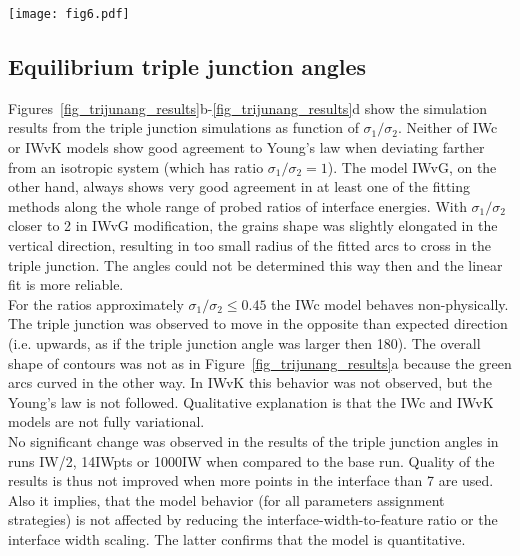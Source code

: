 \begin{figure*}[]
	\centering
	\texttt{[image: fig6.pdf]}
	\caption{Triple junction angles. In a) the two methods for angles determination are illustrated (points fitted by straight lines in red and those fitted by circular arc in green). Subfigures b)-d) show the simulation results for different models, these being: in b) IWc, in c) IWvG and in d) IWvK. The hollow symbols correspond to the the angles determined by arc fitting and crosses to the lines fitting.}
	\label{fig_trijunang_results}
\end{figure*}


\subsection{Equilibrium triple junction angles}\label{subsec_paper1_results_trijun}
Figures~\ref{fig_trijunang_results}b-\ref{fig_trijunang_results}d show the simulation results from the triple junction simulations as function of $\sigma_1/\sigma_2$. Neither of IWc or IWvK models show good agreement to Young's law when deviating farther from an isotropic system (which has ratio $\sigma_1/\sigma_2=1$). The model IWvG, on the other hand, always shows very good agreement in at least one of the fitting methods along the whole range of probed ratios of interface energies. With $\sigma_1/\sigma_2$ closer to 2 in IWvG modification, the grains shape was slightly elongated in the vertical direction, resulting in too small radius of the fitted arcs to cross in the triple junction. The angles could not be determined this way then and the linear fit is more reliable. \\
For the ratios approximately $\sigma_1/\sigma_2\leq0.45$ the IWc model behaves non-physically. The triple junction was observed to move in the opposite than expected direction (i.e. upwards, as if the triple junction angle was larger then 180\textdegree). The overall shape of contours was not as in Figure~\ref{fig_trijunang_results}a because the green arcs curved in the other way. In IWvK this behavior was not observed, but the Young's law is not followed. Qualitative explanation is that the IWc and IWvK models are not fully variational. \\
No significant change was observed in the results of the triple junction angles in runs IW/2, 14IWpts or 1000IW when compared to the base run. Quality of the results is thus not improved when more points in the interface than 7 are used. Also it implies, that the model behavior (for all parameters assignment strategies) is not affected by reducing the interface-width-to-feature ratio or the interface width scaling. The latter confirms that the model is quantitative.

